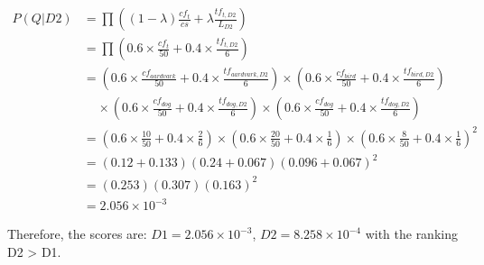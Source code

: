 \documentclass[11pt]{article}
\begin{document}
\begin{enumerate}
        \begin{align*}
            P(Q|D2) &= \prod \left((1 - \lambda) \frac{cf_{t}}{cs} + \lambda \frac{tf_{t,D2}}{L_{D2}}\right) \\
            &= \prod \left(0.6\times \frac{cf_{t}}{50} + 0.4\times \frac{tf_{t,D2}}{6}\right) \\
            &= \left(0.6\times \frac{cf_{aardvark}}{50} + 0.4\times \frac{tf_{aardvark,D2}}{6}\right) \times \left(0.6\times \frac{cf_{bird}}{50} + 0.4\times \frac{tf_{bird,D2}}{6}\right) \\
            & \ \ \ \ \ \times \left(0.6\times \frac{cf_{dog}}{50} + 0.4\times \frac{tf_{dog,D2}}{6}\right) \times \left(0.6\times \frac{cf_{dog}}{50} + 0.4\times \frac{tf_{dog,D2}}{6}\right) \\
            &= \left(0.6\times \frac{10}{50} + 0.4\times \frac{2}{6}\right) \times \left(0.6\times \frac{20}{50} + 0.4\times \frac{1}{6}\right) \times \left(0.6\times \frac{8}{50} + 0.4\times \frac{1}{6}\right)^2 \\
            &= (0.12 + 0.133)(0.24 + 0.067)(0.096 + 0.067)^2 \\
            &= (0.253)(0.307)(0.163)^2 \\
            &= 2.056\times 10^{-3}
        \end{align*}

        Therefore, the scores are: $D1= 2.056\times 10^{-3}$, $D2= 8.258\times 10^{-4}$ with the ranking D2 > D1.

    \end{enumerate}
\end{document}
